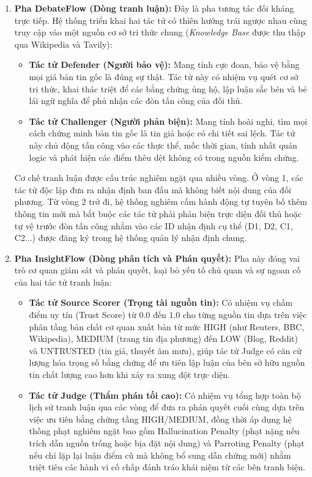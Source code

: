 \documentclass[12pt,a4paper]{report}
\begin{document}
\begin{enumerate}
    \item \textbf{Pha DebateFlow (Dòng tranh luận):} Đây là pha tương tác đối kháng trực tiếp. Hệ thống triển khai hai tác tử có thiên hướng trái ngược nhau cùng truy cập vào một nguồn cơ sở tri thức chung (\textit{Knowledge Base} được thu thập qua Wikipedia và Tavily):
    \begin{itemize}
        \item \textbf{Tác tử Defender (Người bảo vệ):} Mang tính cực đoan, bảo vệ bằng mọi giá bản tin gốc là đúng sự thật. Tác tử này có nhiệm vụ quét cơ sở tri thức, khai thác triệt để các bằng chứng ủng hộ, lập luận sắc bén và bẻ lái ngữ nghĩa để phủ nhận các đòn tấn công của đối thủ.
        \item \textbf{Tác tử Challenger (Người phản biện):} Mang tính hoài nghi, tìm mọi cách chứng minh bản tin gốc là tin giả hoặc có chi tiết sai lệch. Tác tử này chủ động tấn công vào các thực thể, mốc thời gian, tính nhất quán logic và phát hiện các điểm thêu dệt không có trong nguồn kiểm chứng.
    \end{itemize}
    Cơ chế tranh luận được cấu trúc nghiêm ngặt qua nhiều vòng. Ở vòng 1, các tác tử độc lập đưa ra nhận định ban đầu mà không biết nội dung của đối phương. Từ vòng 2 trở đi, hệ thống nghiêm cấm hành động tự tuyên bố thêm thông tin mới mà bắt buộc các tác tử phải phản biện trực diện đối thủ hoặc tự vệ trước đòn tấn công nhắm vào các ID nhận định cụ thể (D1, D2, C1, C2...) được đăng ký trong hệ thống quản lý nhận định chung.
    
    \item \textbf{Pha InsightFlow (Dòng phân tích và Phán quyết):} Pha này đóng vai trò cơ quan giám sát và phán quyết, loại bỏ yếu tố chủ quan và sự ngoan cố của hai tác tử tranh luận:
    \begin{itemize}
        \item \textbf{Tác tử Source Scorer (Trọng tài nguồn tin):} Có nhiệm vụ chấm điểm uy tín (Trust Score) từ $0.0$ đến $1.0$ cho từng nguồn tin dựa trên việc phân tầng bản chất cơ quan xuất bản từ mức HIGH (như Reuters, BBC, Wikipedia), MEDIUM (trang tin địa phương) đến LOW (Blog, Reddit) và UNTRUSTED (tin giả, thuyết âm mưu), giúp tác tử Judge có căn cứ lượng hóa trọng số bằng chứng để ưu tiên lập luận của bên sở hữu nguồn tin chất lượng cao hơn khi xảy ra xung đột trực diện. 
        \item \textbf{Tác tử Judge (Thẩm phán tối cao):} Có nhiệm vụ tổng hợp toàn bộ lịch sử tranh luận qua các vòng để đưa ra phán quyết cuối cùng dựa trên việc ưu tiên bằng chứng tầng HIGH/MEDIUM, đồng thời áp dụng hệ thống phạt nghiêm ngặt bao gồm Hallucination Penalty (phạt nặng nếu trích dẫn nguồn trống hoặc bịa đặt nội dung) và Parroting Penalty (phạt nếu chỉ lặp lại luận điểm cũ mà không bổ sung dẫn chứng mới) nhằm triệt tiêu các hành vi cố chấp đánh tráo khái niệm từ các bên tranh biện.
    \end{itemize}
\end{enumerate}
\end{document}
